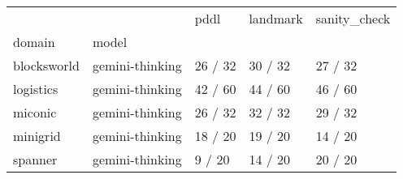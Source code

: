 \begin{tabular}{lllll}
\toprule
 &  & pddl & landmark & sanity\_check \\
domain & model &  &  &  \\
\midrule
blocksworld & gemini-thinking & 26 / 32 & 30 / 32 & 27 / 32 \\
\cline{1-5}
logistics & gemini-thinking & 42 / 60 & 44 / 60 & 46 / 60 \\
\cline{1-5}
miconic & gemini-thinking & 26 / 32 & 32 / 32 & 29 / 32 \\
\cline{1-5}
minigrid & gemini-thinking & 18 / 20 & 19 / 20 & 14 / 20 \\
\cline{1-5}
spanner & gemini-thinking & 9 / 20 & 14 / 20 & 20 / 20 \\
\cline{1-5}
\end{tabular}